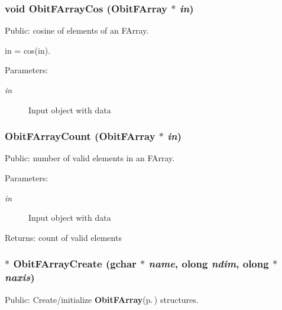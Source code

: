\subsubsection{\setlength{\rightskip}{0pt plus 5cm}void Obit\-FArray\-Cos ({\bf Obit\-FArray} $\ast$ {\em in})}\label{ObitFArray_8h_a79}


Public: cosine of elements of an FArray. 

in = cos(in). \begin{Desc}
\item[Parameters:]
\begin{description}
\item[{\em in}]Input object with data \end{description}
\end{Desc}
\subsubsection{ Obit\-FArray\-Count ({\bf Obit\-FArray} $\ast$ {\em in})}\label{ObitFArray_8h_a82}


Public: number of valid elements in an FArray. 

\begin{Desc}
\item[Parameters:]
\begin{description}
\item[{\em in}]Input object with data \end{description}
\end{Desc}
\begin{Desc}
\item[Returns:]count of valid elements \end{Desc}
\subsubsection{$\ast$ Obit\-FArray\-Create (gchar $\ast$ {\em name}, {\bf olong} {\em ndim}, {\bf olong} $\ast$ {\em naxis})}\label{ObitFArray_8h_a56}


Public: Create/initialize {\bf Obit\-FArray}{\rm (p.\,\pageref{structObitFArray})} structures. 

